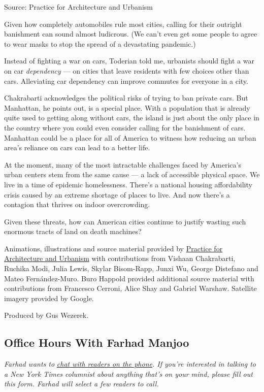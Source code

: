 Source: Practice for Architecture and Urbanism

Given how completely automobiles rule most cities, calling for their
outright banishment can sound almost ludicrous. (We can't even get some
people to agree to wear masks to stop the spread of a devastating
pandemic.)

Instead of fighting a war on cars, Toderian told me, urbanists should
fight a war on car \emph{dependency} --- on cities that leave residents
with few choices other than cars. Alleviating car dependency can improve
commutes for everyone in a city.

Chakrabarti acknowledges the political risks of trying to ban private
cars. But Manhattan, he points out, is a special place. With a
population that is already quite used to getting along without cars, the
island is just about the only place in the country where you could even
consider calling for the banishment of cars. Manhattan could be a place
for all of America to witness how reducing an urban area's reliance on
cars can lead to a better life.

At the moment, many of the most intractable challenges faced by
America's urban centers stem from the same cause --- a lack of
accessible physical space. We live in a time of epidemic homelessness.
There's a national housing affordability crisis caused by an extreme
shortage of places to live. And now there's a contagion that thrives on
indoor overcrowding.

Given these threats, how can American cities continue to justify wasting
such enormous tracts of land on death machines?

Animations, illustrations and source material provided by
\href{http://pau.studio/}{Practice for Architecture and Urbanism} with
contributions from Vishaan Chakrabarti, Ruchika Modi, Julia Lewis,
Skylar Bisom-Rapp, Junxi Wu, George Distefano and Mateo Fernández-Muro.
Buro Happold provided additional source material with contributions from
Francesco Cerroni, Alice Shay and Gabriel Warshaw. Satellite imagery
provided by Google.

Produced by Gus Wezerek.

\hypertarget{office-hours-with-farhad-manjoo}{%
\subsection{Office Hours With Farhad
Manjoo}\label{office-hours-with-farhad-manjoo}}

\emph{Farhad wants to}
\href{https://www.nytimes3xbfgragh.onion/2019/05/16/opinion/farhad-office-hours.html?module=inline}{\emph{chat
with readers on the phone}}\emph{. If you're interested in talking to a
New York Times columnist about anything that's on your mind, please fill
out this form. Farhad will select a few readers to call.}

